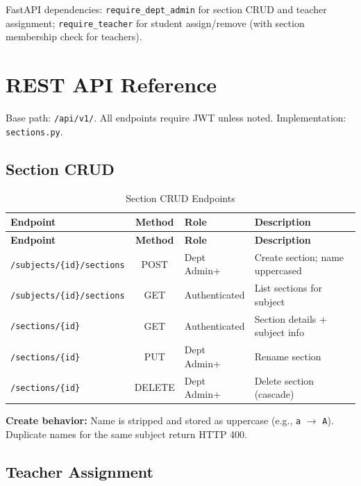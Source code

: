 \documentclass[11pt,a4paper,oneside]{report}
\begin{document}
FastAPI dependencies: \texttt{require\_dept\_admin} for section CRUD and teacher assignment; \texttt{require\_teacher} for student assign/remove (with section membership check for teachers).

\chapter{REST API Reference}
\label{ch:api}

Base path: \texttt{/api/v1/}. All endpoints require JWT unless noted. Implementation: \texttt{sections.py}.

\section{Section CRUD}

\begin{longtable}{@{}p{5.2cm}cp{2.8cm}p{3.8cm}@{}}
  \caption{Section CRUD Endpoints} \label{tab:crud} \\
  \toprule
  \textbf{Endpoint} & \textbf{Method} & \textbf{Role} & \textbf{Description} \\
  \midrule
  \endfirsthead
  \toprule
  \textbf{Endpoint} & \textbf{Method} & \textbf{Role} & \textbf{Description} \\
  \midrule
  \endhead
  \texttt{/subjects/\{id\}/sections} & POST & Dept Admin+ & Create section; name uppercased \\
  \texttt{/subjects/\{id\}/sections} & GET & Authenticated & List sections for subject \\
  \texttt{/sections/\{id\}} & GET & Authenticated & Section details + subject info \\
  \texttt{/sections/\{id\}} & PUT & Dept Admin+ & Rename section \\
  \texttt{/sections/\{id\}} & DELETE & Dept Admin+ & Delete section (cascade) \\
  \bottomrule
\end{longtable}

\textbf{Create behavior:} Name is stripped and stored as uppercase (e.g., \texttt{a} $\rightarrow$ \texttt{A}). Duplicate names for the same subject return HTTP 400.

\section{Teacher Assignment}
\end{document}
